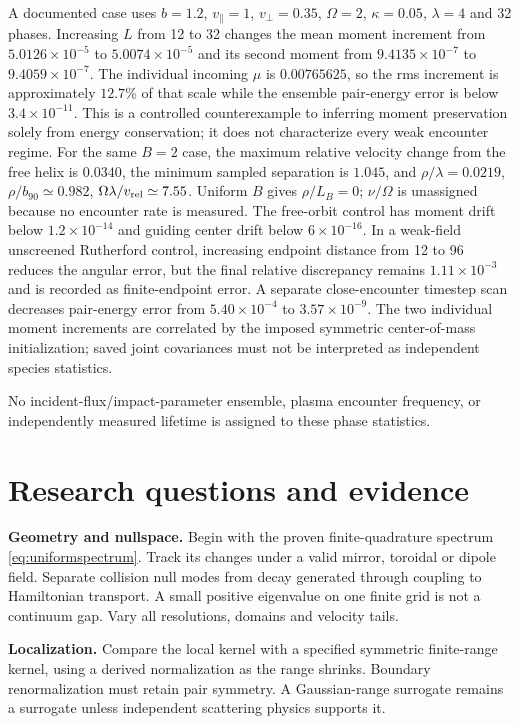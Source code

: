 \documentclass[11pt,letterpaper]{article}
\begin{document}
A documented case uses $b=1.2$, $v_\parallel=1$, $v_\perp=0.35$,
$\Omega=2$, $\kappa=0.05$, $\lambda=4$ and 32 phases.
Increasing $L$ from 12 to 32 changes the mean moment increment from
$5.0126\times10^{-5}$ to $5.0074\times10^{-5}$ and its second moment from
$9.4135\times10^{-7}$ to $9.4059\times10^{-7}$.
The individual incoming $\mu$ is $0.00765625$, so the rms increment is
approximately $12.7\%$ of that scale while the ensemble pair-energy error is below $3.4\times10^{-11}$.
This is a controlled counterexample to inferring moment preservation
solely from energy conservation; it does not characterize every weak encounter
regime. For the same $B=2$ case, the maximum relative velocity change from the free
helix is $0.0340$, the minimum sampled separation is $1.045$, and
$\rho/\lambda=0.0219$, $\rho/b_{90}\simeq0.982$,
$\Omega\lambda/v_{\rm rel}\simeq7.55$. Uniform $B$ gives $\rho/L_B=0$;
$\nu/\Omega$ is unassigned because no encounter rate is measured.
The free-orbit control has moment drift below $1.2\times10^{-14}$ and guiding
center drift below $6\times10^{-16}$. In a weak-field unscreened Rutherford
control, increasing endpoint distance from 12 to 96 reduces the angular error,
but the final relative discrepancy remains $1.11\times10^{-3}$ and is recorded
as finite-endpoint error. A separate close-encounter timestep scan decreases
pair-energy error from $5.40\times10^{-4}$ to $3.57\times10^{-9}$.
The two individual moment increments are correlated by the imposed symmetric
center-of-mass initialization; saved joint covariances must not be interpreted
as independent species statistics.

No incident-flux/impact-parameter ensemble, plasma encounter frequency,
or independently measured lifetime is assigned to these phase statistics.

\section{Research questions and evidence}

\textbf{Geometry and nullspace.} Begin with the proven finite-quadrature spectrum
\eqref{eq:uniformspectrum}. Track its changes under a valid mirror, toroidal or
dipole field. Separate collision null modes from decay generated through coupling
to Hamiltonian transport. A small positive eigenvalue on one finite grid is not a
continuum gap. Vary all resolutions, domains and velocity tails.

\textbf{Localization.} Compare the local kernel with a specified symmetric
finite-range kernel, using a derived normalization as the range shrinks.
Boundary renormalization must retain pair symmetry. A Gaussian-range surrogate
remains a surrogate unless independent scattering physics supports it.
\end{document}
